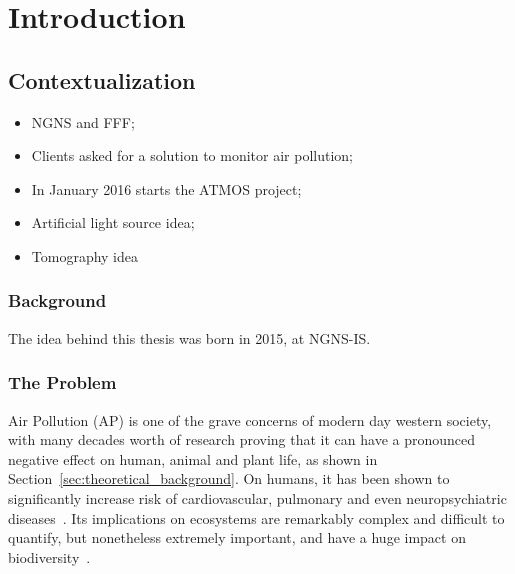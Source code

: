 \newcommand{\novathesis}{\emph{novathesis}}
\newcommand{\novathesisclass}{\texttt{novathesis.cls}}


\chapter{Introduction}
\label{cha:introduction}

\section{Contextualization}%
\label{sec:contextualisation}
\begin{itemize}
    \item NGNS and FFF;
    \item Clients asked for a solution to monitor air pollution;
    \item In January 2016 starts the ATMOS project;
    \item Artificial light source idea;
    \item Tomography idea
\end{itemize}

\subsection{Background}%
\label{sub:background}

The idea behind this thesis was born in 2015, at NGNS-IS. 

\subsection{The Problem}%
\label{sub:the_problem}

Air Pollution (\gls{AP}) is one of the grave concerns of modern day
western society, with many decades worth of research proving that it can
have a pronounced negative effect on human, animal and plant life, as
shown in Section~\ref{sec:theoretical_background}. On humans, it has
been shown to significantly increase risk of cardiovascular, pulmonary
and even neuropsychiatric diseases~\cite{Carugno2016, Ghorani-Azam2016,
Kampa2008}. Its implications on ecosystems are remarkably complex and
difficult to quantify, but nonetheless extremely important, and have a
huge impact on biodiversity~\cite{Lovett2009}.

